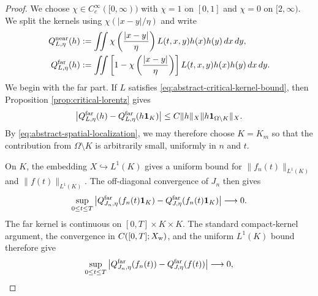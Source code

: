 \documentclass[11pt,reqno]{amsproc}
\newcommand{\Om}{\Omega}
\newcommand{\one}{\mathbf 1}
\newcommand{\dd}{\,d}
\begin{document}
\begin{proof}
We choose $\chi\in C_c^\infty([0,\infty))$ with $\chi=1$ on $[0,1]$ and
$\chi=0$ on $[2,\infty)$.  We split the kernels using
$\chi(|x-y|/\eta)$ and write
\begin{align*}
 Q_{L,\eta}^{\rm near}(h)
 &:=\iint \chi\left(\frac{|x-y|}{\eta}\right)
 L(t,x,y)h(x)h(y)\dd x\dd y,\\
 Q_{L,\eta}^{\rm far}(h)
 &:=\iint \left[1-\chi\left(\frac{|x-y|}{\eta}\right)\right]
 L(t,x,y)h(x)h(y)\dd x\dd y.
\end{align*}
We begin with the far part.  If $L$ satisfies
\eqref{eq:abstract-critical-kernel-bound}, then Proposition
\ref{prop:critical-lorentz} gives
\[
 \left|Q_{L,\eta}^{\rm far}(h)
       -Q_{L,\eta}^{\rm far}(h\one_K)\right|
 \leq C\|h\|_X\|h\one_{\Om\setminus K}\|_X.
\]
By \eqref{eq:abstract-spatial-localization}, we may therefore choose
$K=K_m$ so that the contribution from $\Om\setminus K$ is arbitrarily small,
uniformly in $n$ and $t$.

On $K$, the embedding $X\hookrightarrow L^1(K)$ gives a uniform bound for
$\|f_n(t)\|_{L^1(K)}$ and $\|f(t)\|_{L^1(K)}$.  The off-diagonal convergence
of $J_n$ then gives
\[
 \sup_{0\leq t\leq T}
 \left|Q_{J_n,\eta}^{\rm far}(f_n(t)\one_K)
       -Q_{J,\eta}^{\rm far}(f_n(t)\one_K)\right|
 \longrightarrow0.
\]
The far kernel is continuous on $[0,T]\times K\times K$.  The standard
compact-kernel argument, the convergence in $C([0,T];X_{\rm w})$, and the
uniform $L^1(K)$ bound therefore give
\begin{equation}\label{eq:far-field-convergence}
 \sup_{0\leq t\leq T}
\left|Q_{J_n,\eta}^{\rm far}(f_n(t))
       -Q_{J,\eta}^{\rm far}(f(t))\right|\longrightarrow0,
\end{equation}


\end{proof}
\end{document}
